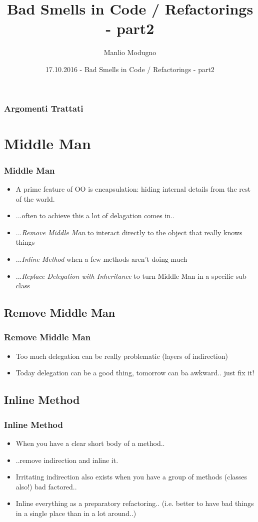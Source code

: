 \documentclass{beamer}
\title{Bad Smells in Code / Refactorings - part2}
\author{Manlio Modugno}
\institute[GMTechnologies]
\date[17.10.2016] 
{17.10.2016 - Bad Smells in Code / Refactorings - part2}
\begin{document}
\begin{frame}
  \titlepage
\end{frame}

\begin{frame}
  \frametitle{Argomenti Trattati}
  \tableofcontents
\end{frame}

\section{Middle Man}
\begin{frame}
  \frametitle{Middle Man}
  \begin{itemize}
	\item<+-> A prime feature of OO is encapsulation: hiding internal details from the rest of the world.
	\item<+-> ...often to achieve this a lot of delagation comes in..
	\item<+-> ...\textit{Remove Middle Man} to interact directly to the object that really knows things
	\item<+-> ...\textit{Inline Method} when a few methods aren't doing much
	\item<+-> ...\textit{Replace Delegation with Inheritance} to turn Middle Man in a specific sub class
   \end{itemize}
\end{frame}

\subsection{Remove Middle Man}
\begin{frame}
  \frametitle{Remove Middle Man}
  \begin{itemize}
	\item<+-> Too much delegation can be really problematic (layers of indirection)
	\item<+-> Today delegation can be a good thing, tomorrow can ba awkward.. just fix it!
   \end{itemize}
\end{frame}

\subsection{Inline Method}
\begin{frame}
  \frametitle{Inline Method}
  \begin{itemize}
	\item<+-> When you have a clear short body of a method.. 
	\item<+-> ..remove indirection and inline it.
	\item<+-> Irritating indirection also exists when you have a group of methods (classes also!) bad factored..
	\item<+-> Inline everything as a preparatory refactoring.. (i.e. better to have bad things in a single place than in a lot around..)
   \end{itemize}
\end{frame}
\end{document}
